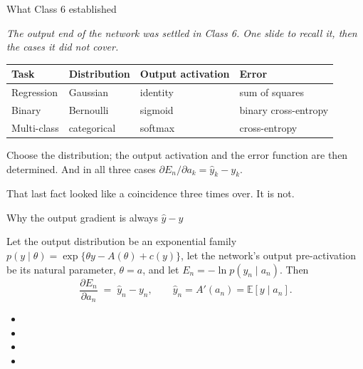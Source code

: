 \documentclass[aspectratio=169, 11pt]{beamer}
\newcommand{\bridge}[1]{%
  {\scriptsize\itshape\color{mcMuted} #1\par}\vspace{0.35em}}
\newcommand{\src}[3]{}      %
\newcommand{\nosrc}{}       %
\begin{document}
\begin{frame}{What Class 6 established}
  \nosrc
  \bridge{The output end of the network was settled in Class 6. One
  slide to recall it, then the cases it did not cover.}
  \vspace{0.3em}
  \centering
  \renewcommand{\arraystretch}{1.3}
  {\small
  \begin{tabular}{p{} p{}
                  p{} p{}}
    \textbf{Task} & \textbf{Distribution} &
    \textbf{Output activation} & \textbf{Error}\\
    \hline
    Regression & Gaussian & identity & sum of squares\\
    Binary & Bernoulli & sigmoid & binary cross-entropy\\
    Multi-class & categorical & softmax & cross-entropy\\
    \hline
  \end{tabular}}
  \vspace{0.6em}

  {\small Choose the distribution; the output activation and the error
  function are then \alert{determined}. And in all three cases
  $\partial E_n/\partial a_k = \hat y_k - y_k$.}
  \vspace{0.3em}

  {\small That last fact looked like a coincidence three times over.
  It is not.}
\end{frame}

\begin{frame}{Why the output gradient is always $\hat y - y$}
  \src{bishop2024}{equation}{5.95}
  \src{bishop2024}{section}{5.4.6}
  \vspace{0.05em}
  \begin{theorem}
    {\small Let the output distribution be an exponential family
    $p(y\mid\theta)=\exp\{\theta y - A(\theta) + c(y)\}$, let the
    network's output pre-activation be its natural parameter,
    $\theta = a$, and let $E_n=-\ln p(y_n\mid a_n)$. Then
    \[
      \frac{\partial E_n}{\partial a_n} \;=\; \hat y_n - y_n,
      \qquad \hat y_n = A'(a_n) = \mathbb{E}[y\mid a_n].
    \]}
  \end{theorem}
  \vspace{-0.05em}
  {\footnotesize
  \begin{itemize}\setlength{\itemsep}{0pt}
    \item {}
    \item {}
    \item {}
    \item {}
  \end{itemize}}
\end{frame}
\end{document}
